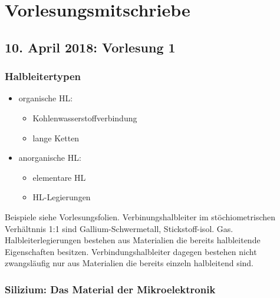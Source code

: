 \documentclass[12pt,a4paper]{report}%
\numberwithin{equation}{section}
\numberwithin{equation}{subsection}
\begin{document}
\chapter{Vorlesungsmitschriebe}
\section{10. April 2018: Vorlesung 1}
	  \subsection{Halbleitertypen}
		\begin{itemize}
		  \item organische HL: 
		  \begin{itemize}
		    \item Kohlenwasserstoffverbindung
		    \item lange Ketten
		  \end{itemize}
		  \item anorganische HL:
		  \begin{itemize}
		    \item elementare HL
		    \item HL-Legierungen
		  \end{itemize}
		\end{itemize}
		Beispiele siehe Vorlesungsfolien.\newline
    Verbinungshalbleiter im stöchiometrischen Verhältnnis 1:1 sind Gallium-Schwermetall, Stickstoff-isol. Gas. 
    Halbleiterlegierungen bestehen aus Materialien die bereits halbleitende Eigenschaften besitzen. Verbindungshalbleiter dagegen bestehen nicht zwangsläufig nur aus Materialien die bereits einzeln halbleitend sind. 
    
    \subsection{Silizium: Das Material der Mikroelektronik}
\end{document}
